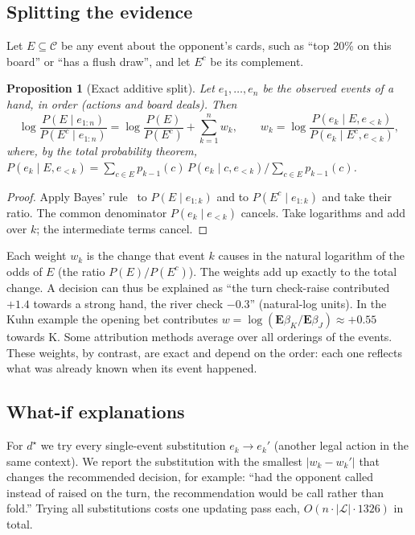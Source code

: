 \documentclass[11pt,a4paper]{article}
\newtheorem{proposition}{Proposition}
\newcommand{\E}{\mathbf{E}}
\newcommand{\1}{\mathbf{1}}
\newcommand{\BT}[1]{\cite[§#1]{bertsekas2000}}
\begin{document}
\subsection{Splitting the evidence}
Let $E\subseteq\mathcal{C}$ be any event about the opponent's cards, such as
``top 20\% on this board'' or ``has a flush draw'', and let $E^c$ be its
complement.

\begin{proposition}[Exact additive split]\label{prop:attr}
Let $e_1,\dots,e_n$ be the observed events of a hand, in order (actions and
board deals). Then
\begin{equation}
  \log\frac{P(E\mid e_{1:n})}{P(E^c\mid e_{1:n})}
  =\log\frac{P(E)}{P(E^c)}+\sum_{k=1}^n w_k,\qquad
  w_k=\log\frac{P(e_k\mid E,e_{<k})}{P(e_k\mid E^c,e_{<k})},
\end{equation}
where, by the total probability theorem,
$P(e_k\mid E,e_{<k})=\sum_{c\in E}p_{k-1}(c)\,P(e_k\mid c,e_{<k})\big/\sum_{c\in E}p_{k-1}(c)$.
\end{proposition}
\begin{proof}
Apply Bayes' rule~\BT{1.4} to $P(E\mid e_{1:k})$ and to $P(E^c\mid e_{1:k})$ and
take their ratio. The common denominator $P(e_k\mid e_{<k})$ cancels. Take
logarithms and add over $k$; the intermediate terms cancel.
\end{proof}

Each weight $w_k$ is the change that event $k$ causes in the natural
logarithm of the odds of $E$ (the ratio $P(E)/P(E^c)$). The weights add up
exactly to the total change. A decision can thus be explained as ``the turn
check-raise contributed $+1.4$ towards a strong hand, the river check $-0.3$''
(natural-log units). In the Kuhn example the opening bet contributes
$w=\log(\E\beta_K/\E\beta_J)\approx+0.55$ towards K. Some attribution methods
average over all orderings of the events. These weights, by contrast, are
exact and depend on the order: each one reflects what was already known when
its event happened.

\subsection{What-if explanations}
For $d^\star$ we try every single-event substitution $e_k\to e_k'$ (another legal
action in the same context). We report the substitution with the smallest
$|w_k-w_k'|$ that changes the recommended decision, for example: ``had the
opponent called instead of raised on the turn, the recommendation would be
call rather than fold.'' Trying all substitutions costs one updating pass each,
$O(n\cdot|\mathcal{L}|\cdot1326)$ in total.
\end{document}
